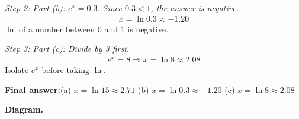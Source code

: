 \documentclass[11pt]{article}
\begin{document}
\textit{Step 2: Part (b): \( e^x = 0.3 \). Since \( 0.3 < 1 \), the answer is negative.}
\[\begin{gathered}
x = \ln 0.3 \approx -1.20
\end{gathered}\]
\( \ln \) of a number between 0 and 1 is negative.

\textit{Step 3: Part (c): Divide by 3 first.}
\[\begin{gathered}
e^x = 8 \Rightarrow x = \ln 8 \approx 2.08
\end{gathered}\]
Isolate \( e^x \) before taking \( \ln \).

\begin{answerbox}
\textbf{Final answer:}\quad (a) \(\displaystyle  x = \ln 15 \approx 2.71 \) \quad  (b) \(\displaystyle  x = \ln 0.3 \approx -1.20 \) \quad  (c) \(\displaystyle  x = \ln 8 \approx 2.08 \)
\end{answerbox}
\textbf{Diagram.}
\end{document}
